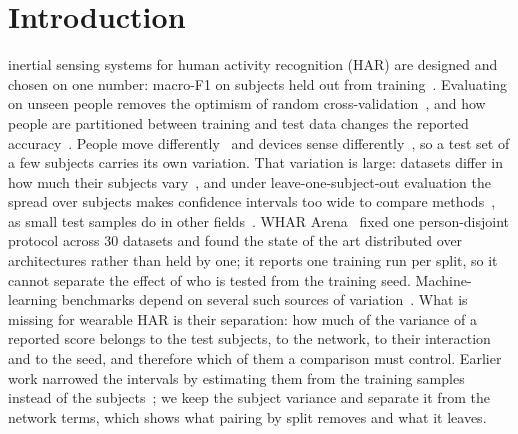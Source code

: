 \documentclass{IEEE_lsens}
\begin{document}
\section{Introduction}
 inertial sensing systems for human activity recognition (HAR) are designed and chosen on one number:
macro-F1 on subjects held out from training~\cite{bulling2014tutorial}. Evaluating on unseen people removes the
optimism of random cross-validation~\cite{hammerla2015lets}, and how people are partitioned between training and test
data changes the reported accuracy~\cite{lockhart2014limitations}. People move differently~\cite{qian2021latent} and
devices sense differently~\cite{stisen2015smart}, so a test set of a few subjects carries its own variation. That
variation is large: datasets differ in how much their subjects vary~\cite{barshan2016investigating}, and under
leave-one-subject-out evaluation the spread over subjects makes confidence intervals too wide to compare
methods~\cite{jordao2018human}, as small test samples do in other fields~\cite{varoquaux2018cross}. WHAR
Arena~\cite{burzer2026arena} fixed one person-disjoint protocol across 30 datasets and found the state of the art
distributed over architectures rather than held by one; it reports one training run per split, so it cannot separate
the effect of who is tested from the training seed. Machine-learning benchmarks depend on several such sources of
variation~\cite{bouthillier2021accounting}. What is missing for wearable HAR is their separation: how much of the
variance of a reported score belongs to the test subjects, to the network, to their interaction and to the seed, and
therefore which of them a comparison must control. Earlier work narrowed the intervals by estimating them from the
training samples instead of the subjects~\cite{jordao2018human}; we keep the subject variance and separate it from the
network terms, which shows what pairing by split removes and what it leaves.
\end{document}
